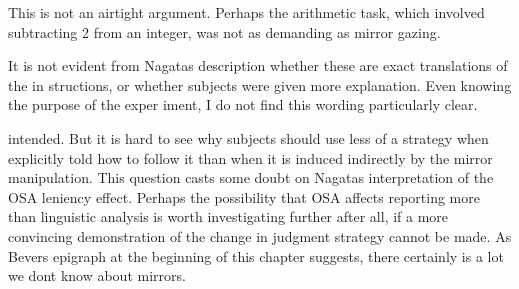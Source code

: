 \setcounter{listWWNumxxxiileveli}{5}
\begin{listWWNumxxxiileveli}
\item 
\begin{styleStandard}
This is not an airtight argument. Perhaps the arithmetic task, which involved subtracting 2 from an integer, was not as demanding as mirror gazing.
\end{styleStandard}


\item 
\begin{styleStandard}
It is not evident from Nagata{\textquotesingle}s description whether these are exact translations of the in\- structions, or whether subjects were given more explanation. Even knowing the purpose of the exper\- iment, I do not find this wording particularly clear.
\end{styleStandard}


\end{listWWNumxxxiileveli}
\clearpage\setcounter{page}{1}\begin{styleStandard}
intended. But it is hard to see why subjects should use less of a strategy when explicitly told how to follow it than when it is induced indirectly by the mirror manipulation. This question casts some doubt on Nagata{\textquotesingle}s interpretation of the OSA leniency effect. Perhaps the possibility that OSA affects reporting more than linguistic analysis is worth investigating further after all, if a more convincing demonstration of the change in judgment strategy cannot be made. As Bever{\textquotesingle}s epigraph at the beginning of this chapter suggests, there certainly is a lot we don{\textquotesingle}t know about mirrors.
\end{styleStandard}


